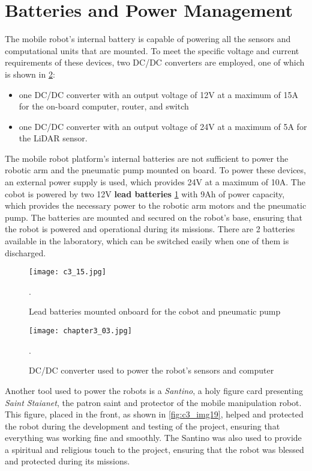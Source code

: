 \section{Batteries and Power Management}

The mobile robot's internal battery is capable of powering all the sensors and computational
units that are mounted. To meet the specific voltage and current requirements of these devices, 
two DC/DC converters are employed, one of which is shown in \ref{fig:c3_img03}:

\begin{itemize}
    \item one DC/DC converter with an output voltage of 12V at a maximum of 15A for the on-board computer, router, and switch
    \item one DC/DC converter with an output voltage of 24V at a maximum of 5A for the LiDAR sensor.
\end{itemize}

The mobile robot platform's internal batteries are not sufficient to power the robotic arm and the pneumatic pump
mounted on board. To power these devices, an external power supply is used, which provides 24V at a maximum of 10A.
The cobot is powered by two 12V \textbf{lead batteries} \ref{fig:c3_img15} with 9Ah of power capacity, 
which provides the necessary power to the robotic arm motors and the pneumatic pump. 
The batteries are mounted and secured on the robot's base,
ensuring that the robot is powered and operational during its missions. There are 2 batteries available
in the laboratory, which can be switched easily when one of them is discharged.

\begin{figure}[t]
    \centering
    \texttt{[image: c3\_15.jpg]}
    \captionsetup{width=1\linewidth}
    \caption{Lead batteries mounted onboard for the cobot and pneumatic pump}.
    \label{fig:c3_img15}
\end{figure}

\begin{figure}[t]
    \centering
    \texttt{[image: chapter3\_03.jpg]}
    \captionsetup{width=1\linewidth}
    \caption{DC/DC converter used to power the robot's sensors and computer}.
    \label{fig:c3_img03}
\end{figure}

Another tool used to power the robots is a \textit{Santino}, a holy figure card presenting \textit{Saint Staianet}, 
the patron saint and protector of the mobile manipulation robot. This figure, placed in the front, as shown in \ref{fig:c3_img19},
helped and protected the robot during the development and testing of the project, ensuring that everything
was working fine and smoothly. The Santino was also used to provide a spiritual and religious touch to the project,
ensuring that the robot was blessed and protected during its missions.

